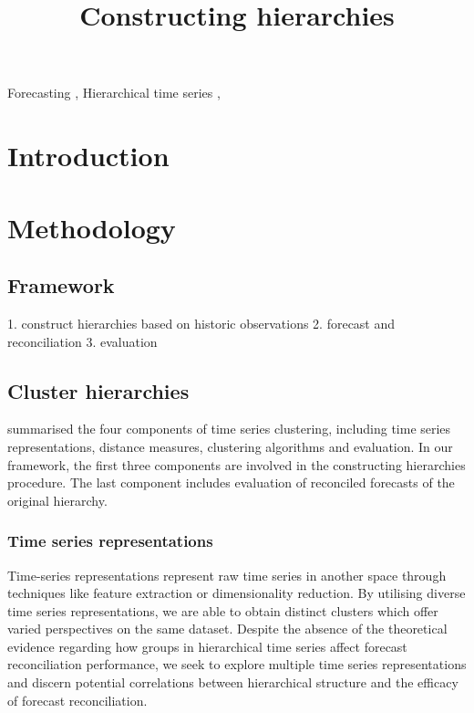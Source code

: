 \documentclass[a4paper,review,12pt,authoryear]{elsarticle}
\begin{document}
\begin{frontmatter}

  \title{Constructing hierarchies}


  \begin{abstract}

    

  \end{abstract}

  \begin{keyword}
  Forecasting \sep
  Hierarchical time series \sep
  
  \end{keyword}

\end{frontmatter}

\newpage

\section{Introduction}


\section{Methodology}
\label{sec:method}

\subsection{Framework}

1. construct hierarchies based on historic observations
2. forecast and reconciliation
3. evaluation

\subsection{Cluster hierarchies}

\cite{aghabozorgiTimeseriesClusteringDecade2015a} summarised the four components of time series clustering, including time series representations, distance measures, clustering algorithms and evaluation. In our framework, the first three components are involved in the constructing hierarchies procedure. The last component includes evaluation of reconciled forecasts of the original hierarchy.

\subsubsection*{Time series representations}

Time-series representations represent raw time series in another space through techniques like feature extraction or dimensionality reduction. By utilising diverse time series representations, we are able to obtain distinct clusters which offer varied perspectives on the same dataset. 
Despite the absence of the theoretical evidence regarding how groups in hierarchical time series affect forecast reconciliation performance, we seek to explore multiple time series representations and discern potential correlations between hierarchical structure and the efficacy of forecast reconciliation.
\end{document}
